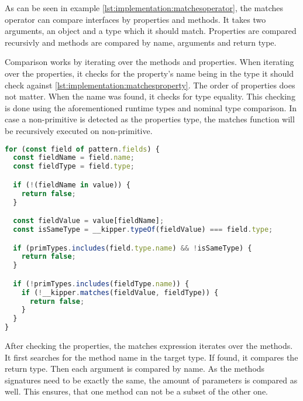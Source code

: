 As can be seen in example \ref{lst:implementation:matchesoperator}, the matches operator can compare interfaces by properties and methods. It takes two arguments, an object and a type which it should match. Properties are compared recursivly and methods are compared by name, arguments and return type.

Comparison works by iterating over the methods and properties. When iterating over the properties, it checks for the property's name being in the type it should check against \ref{lst:implementation:matchesproperty}. The order of properties does not matter. When the name was found, it checks for type equality. This checking is done using the aforementioned runtime types and nominal type comparison. In case a non-primitive is detected as the properties type, the matches function will be recursively executed on non-primitive.

\begin{lstlisting}[language=Typescript,caption=Matches operator property comparison,label=lst:implementation:matchesproperty]
for (const field of pattern.fields) {
  const fieldName = field.name;
  const fieldType = field.type;

  if (!(fieldName in value)) {
    return false;
  }

  const fieldValue = value[fieldName];
  const isSameType = __kipper.typeOf(fieldValue) === field.type;

  if (primTypes.includes(field.type.name) && !isSameType) {
    return false;
  }

  if (!primTypes.includes(fieldType.name)) {
    if (!__kipper.matches(fieldValue, fieldType)) {
      return false;
    }
  }
}
\end{lstlisting}

After checking the properties, the matches expression iterates over the methods. It first searches for the method name in the target type. If found, it compares the return type. Then each argument is compared by name. As the methods signatures need to be exactly the same, the amount of parameters is compared as well. This ensures, that one method can not be a subset of the other one.

